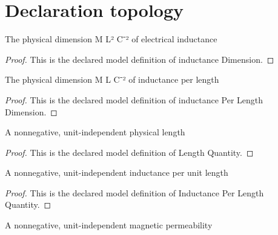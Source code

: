 \section{Declaration topology}
\begin{definition}
  \label{def:physics:phyx-mini-0885:phyxminiproblems-problemphyxmini0885-inductancedimension}
  The physical dimension M L² C⁻² of electrical inductance
\end{definition}
\begin{proof}
  This is the declared model definition of inductance Dimension.
\end{proof}
\begin{definition}
  \label{def:physics:phyx-mini-0885:phyxminiproblems-problemphyxmini0885-inductanceperlengthdimension}
  The physical dimension M L C⁻² of inductance per length
\end{definition}
\begin{proof}
  This is the declared model definition of inductance Per Length Dimension.
\end{proof}
\begin{definition}
  \label{def:physics:phyx-mini-0885:phyxminiproblems-problemphyxmini0885-lengthquantity}
  A nonnegative, unit-independent physical length
\end{definition}
\begin{proof}
  This is the declared model definition of Length Quantity.
\end{proof}
\begin{definition}
  \label{def:physics:phyx-mini-0885:phyxminiproblems-problemphyxmini0885-inductanceperlengthquantity}
  A nonnegative, unit-independent inductance per unit length
\end{definition}
\begin{proof}
  This is the declared model definition of Inductance Per Length Quantity.
\end{proof}
\begin{definition}
  \label{def:physics:phyx-mini-0885:phyxminiproblems-problemphyxmini0885-magneticpermeabilityquantity}
  A nonnegative, unit-independent magnetic permeability
\end{definition}

